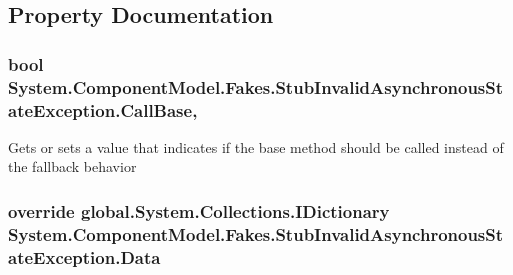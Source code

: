 \subsection{Property Documentation}
\hypertarget{class_system_1_1_component_model_1_1_fakes_1_1_stub_invalid_asynchronous_state_exception_ac5f4d60a90562b45a733be39684f7394}{
\subsubsection[{Call\-Base}]{\setlength{\rightskip}{0pt plus 5cm}bool System.\-Component\-Model.\-Fakes.\-Stub\-Invalid\-Asynchronous\-State\-Exception.\-Call\-Base\hspace{0.3cm}{\ttfamily [get]}, {\ttfamily [set]}}}\label{class_system_1_1_component_model_1_1_fakes_1_1_stub_invalid_asynchronous_state_exception_ac5f4d60a90562b45a733be39684f7394}


Gets or sets a value that indicates if the base method should be called instead of the fallback behavior

\hypertarget{class_system_1_1_component_model_1_1_fakes_1_1_stub_invalid_asynchronous_state_exception_afe2bb8264badc398c3052975463998b6}{
\subsubsection[{Data}]{\setlength{\rightskip}{0pt plus 5cm}override global.\-System.\-Collections.\-I\-Dictionary System.\-Component\-Model.\-Fakes.\-Stub\-Invalid\-Asynchronous\-State\-Exception.\-Data\hspace{0.3cm}{\ttfamily [get]}}}\label{class_system_1_1_component_model_1_1_fakes_1_1_stub_invalid_asynchronous_state_exception_afe2bb8264badc398c3052975463998b6}


